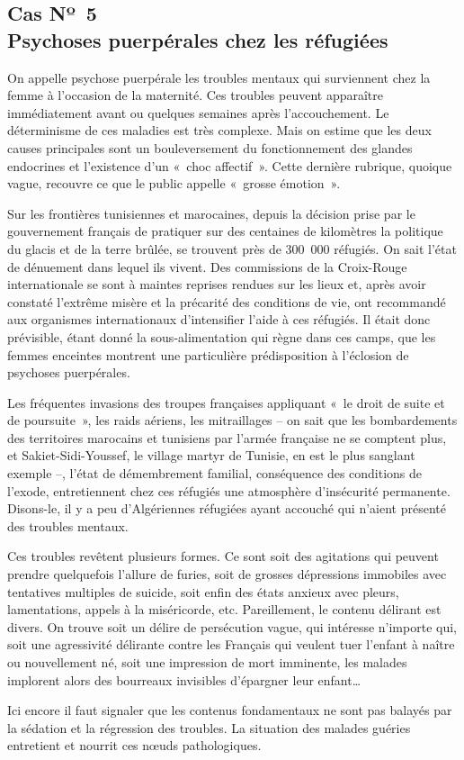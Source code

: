\documentclass[french,twoside]{book} %
\begin{document}
\subsection[{Cas Nº 5. Psychoses puerpérales chez les réfugiées}]{Cas Nº 5 \\
Psychoses puerpérales chez les réfugiées}
\noindent On appelle psychose puerpérale les troubles mentaux qui surviennent chez la femme à l’occasion de la maternité. Ces   troubles peuvent apparaître immédiatement avant ou quelques semaines après l’accouchement. Le déterminisme de ces maladies est très complexe. Mais on estime que les deux causes principales sont un bouleversement du fonctionnement des glandes endocrines et l’existence d’un « choc affectif ». Cette dernière rubrique, quoique vague, recouvre ce que le public appelle « grosse émotion ».\par
Sur les frontières tunisiennes et marocaines, depuis la décision prise par le gouvernement français de pratiquer sur des centaines de kilomètres la politique du glacis et de la terre brûlée, se trouvent près de 300 000 réfugiés. On sait l’état de dénuement dans lequel ils vivent. Des commissions de la Croix-Rouge internationale se sont à maintes reprises rendues sur les lieux et, après avoir constaté l’extrême misère et la précarité des conditions de vie, ont recommandé aux organismes internationaux d’intensifier l’aide à ces réfugiés. Il était donc prévisible, étant donné la sous-alimentation qui règne dans ces camps, que les femmes enceintes montrent une particulière prédisposition à l’éclosion de psychoses puerpérales.\par
Les fréquentes invasions des troupes françaises appliquant « le droit de suite et de poursuite », les raids aériens, les mitraillages – on sait que les bombardements des territoires marocains et tunisiens par l’armée française ne se comptent plus, et Sakiet-Sidi-Youssef, le village martyr de Tunisie, en est le plus sanglant exemple –, l’état de démembrement familial, conséquence des conditions de l’exode, entretiennent chez ces réfugiés une atmosphère d’insécurité permanente. Disons-le, il y a peu d’Algériennes réfugiées ayant accouché qui n’aient présenté des troubles mentaux.\par
Ces troubles revêtent plusieurs formes. Ce sont soit des agitations qui peuvent prendre quelquefois l’allure de furies, soit de grosses dépressions immobiles avec tentatives multiples de suicide, soit enfin des états anxieux avec pleurs, lamentations, appels à la miséricorde, etc. Pareillement, le contenu délirant est divers. On trouve soit un délire de persécution vague, qui intéresse n’importe qui, soit une agressivité délirante contre les   Français qui veulent tuer l’enfant à naître ou nouvellement né, soit une impression de mort imminente, les malades implorent alors des bourreaux invisibles d’épargner leur enfant…\par
Ici encore il faut signaler que les contenus fondamentaux ne sont pas balayés par la sédation et la régression des troubles. La situation des malades guéries entretient et nourrit ces nœuds pathologiques.\par
\end{document}
